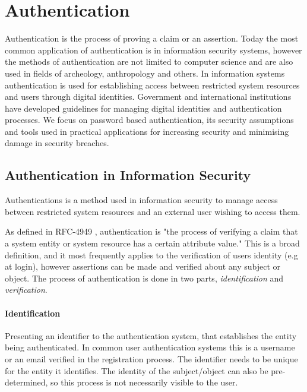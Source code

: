 \section{Authentication}

Authentication is the process of proving a claim or an assertion.
Today the most common application of authentication is in information security systems, however the methods of authentication are not limited to computer science and are also used in fields of archeology, anthropology and others.
\bigskip
\newline
In information systems authentication is used for establishing access between restricted system resources and users through digital identities.
Government and international institutions have developed guidelines for managing digital identities and authentication processes.
\bigskip
\newline
We focus on password based authentication, its security assumptions and tools used in practical applications for increasing security and minimising damage in security breaches.

\subsection{Authentication in Information Security}
Authentications is a method used in information security to manage access between restricted system resources and an external user wishing to access them.

As defined in RFC-4949 \cite{shirey2007internet}, authentication is "the process of verifying a claim that a system entity or system resource has a certain attribute value."
This is a broad definition, and it most frequently applies to the verification of users identity (e.g at login), however assertions can be made and verified about any subject or object.
The process of authentication is done in two parts, \textit{identification} and \textit{verification}.

\paragraph{Identification} Presenting an identifier to the authentication system, that establishes the entity being authenticated.
In common user authentication systems this is a username or an email verified in the registration process. 
The identifier needs to be unique for the entity it identifies.
The identity of the subject/object can also be pre-determined, so this process is not necessarily visible to the user.

